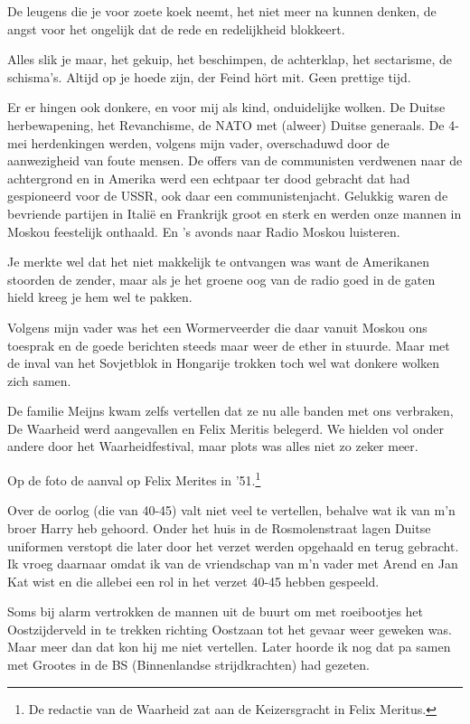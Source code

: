 \documentclass[10pt,twoside,openright]{memoir}
\begin{document}
De leugens die je voor zoete koek neemt, het niet meer na kunnen denken, de angst voor het ongelijk dat de rede en redelijkheid blokkeert. 

Alles slik je maar, het gekuip, het beschimpen, de achterklap, het sectarisme, de schisma's. Altijd op je hoede zijn, der Feind hört mit. Geen prettige tijd. 

Er er hingen ook donkere, en voor mij als kind, onduidelijke wolken. De Duitse herbewapening, het Revanchisme, de NATO met (alweer) Duitse generaals. De 4-mei herdenkingen werden, volgens mijn vader, overschaduwd door de aanwezigheid van foute mensen. De offers van de communisten verdwenen naar de achtergrond en in Amerika werd een echtpaar ter dood gebracht dat had gespioneerd voor de USSR, ook daar een communistenjacht. Gelukkig waren de bevriende partijen in Italië en Frankrijk groot en sterk en werden onze mannen in Moskou feestelijk onthaald. En ’s avonds naar Radio Moskou luisteren. 

Je merkte wel dat het niet makkelijk te ontvangen was want de Amerikanen stoorden de zender, maar als je het groene oog van de radio goed in de gaten hield kreeg je hem wel te pakken. 

Volgens mijn vader was het een Wormerveerder die daar vanuit Moskou ons toesprak en de goede berichten steeds maar weer de ether in stuurde. Maar met de inval van het Sovjetblok in Hongarije trokken toch wel wat donkere wolken zich samen. 

De familie Meijns kwam zelfs vertellen dat ze nu alle banden met ons verbraken, De Waarheid werd aangevallen en Felix Meritis belegerd. We hielden vol onder andere door het Waarheidfestival, maar plots was alles niet zo zeker meer.

Op de foto de aanval op Felix Merites in ’51.\footnote{De redactie van de Waarheid zat aan de Keizersgracht in Felix Meritus.}

Over de oorlog (die van 40-45) valt niet veel te vertellen, behalve wat ik van m’n broer Harry heb gehoord. Onder het huis in de Rosmolenstraat lagen Duitse uniformen verstopt die later door het verzet werden opgehaald en terug gebracht. Ik vroeg daarnaar omdat ik van de vriendschap van m’n vader met Arend en Jan Kat wist en die allebei een rol in het verzet 40-45 hebben gespeeld. 

Soms bij alarm vertrokken de mannen uit de buurt om met roeibootjes het Oostzijderveld in te trekken richting Oostzaan tot het gevaar weer geweken was. Maar meer dan dat kon hij me niet vertellen. Later hoorde ik nog dat pa samen met Grootes in de BS (Binnenlandse strijdkrachten) had gezeten.
\end{document}
